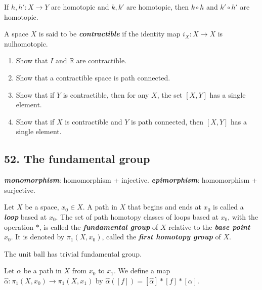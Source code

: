 \begin{myproposition}
[Exercise 1] If $h,h':X\to Y$ are homotopic and $k,k'$ are homotopic, then $k\circ h$ and $k'\circ h'$ are homotopic.
\end{myproposition}

\begin{myproposition}
[Exercise 3]
A space $X$ is said to be \textbf{\emph{contractible}} if the identity map $i_X:X\to X$ is nulhomotopic.
\begin{enumerate}[label={(\alph*)}]
\item Show that $I$ and $\mathbb{R}$ are contractible.
\item Show that a contractible space is path connected.
\item Show that if $Y$ is contractible, then for any $X$, the set $[X,Y]$ has a single element.
\item Show that if $X$ is contractible and $Y$ is path connected, then $[X,Y]$ has a single element.
\end{enumerate}
\end{myproposition}
\clearpage

\subsection{52. The fundamental group}
\begin{notebox}
\textbf{\emph{monomorphism}}: homomorphism + injective. \textbf{\emph{epimorphism}}: homomorphism + surjective.
\end{notebox}

\begin{mydefinition}
Let $X$ be a space, $x_0\in X$. A path in $X$ that begins and ends at $x_0$ is called a \textbf{\emph{loop}} based at $x_0$. The set of path homotopy classes of loops based at $x_0$, with the operation $*$, is called the \textbf{\emph{fundamental group}} of $X$ relative to the \textbf{\emph{base point}} $x_0$. It is denoted by $\pi_1(X,x_0)$, called the \textbf{\emph{first homotopy group}} of $X$.
\end{mydefinition}
\begin{example}
The unit ball has trivial fundamental group.
\end{example}

\begin{mydefinition}
Let $\alpha$ be a path in $X$ from $x_0$ to $x_1$. We define a map $\hat{\alpha}:\pi_1(X,x_0)\to \pi_1(X,x_1)$ by $\hat{\alpha}([f])=[\hat{\alpha}]*[f]*[\alpha]$.
\end{mydefinition}

